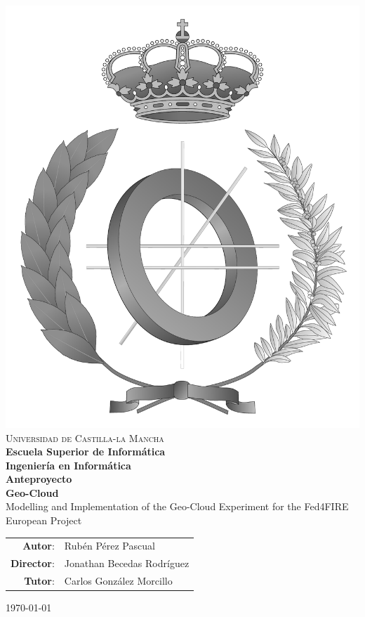 \documentclass[a4paper,spanish,11pt,twoside]{article}
\begin{document}
\renewcommand*{\thepage}{\roman{page}}
\begin{titlepage}
\begin{center}
  \includegraphics[width=.3\textwidth]{logos/emblema_informatica-gray.pdf} \\
  \vspace*{0,5cm} {\Large \textsc{Universidad de Castilla-la Mancha\\}}
  \vspace{3mm}
  {\Large \textbf{Escuela Superior de Informática}}  \\
  \vspace{1,3cm}
  {\Large \textbf{Ingeniería en Informática}}\\
  \vspace{1cm}
  {\Large \textbf{Anteproyecto}} \\
  \vspace{1,3cm}
  \LARGE{\textbf{Geo-Cloud}\\Modelling and Implementation of the Geo-Cloud Experiment for the Fed4FIRE European Project}

\end{center}
\vspace{1.0cm}
\begin{table}[!h]
  \Large
  \begin{tabular}{rl}
      \textbf{Autor}: & Rubén Pérez Pascual \\
      \textbf{Director}: & Jonathan Becedas Rodríguez \\
      \textbf{Tutor}: & Carlos González Morcillo
  \end{tabular}
\end{table}
\begin{flushright}
{\large \today}
\end{flushright}
\end{titlepage}
\end{document}
